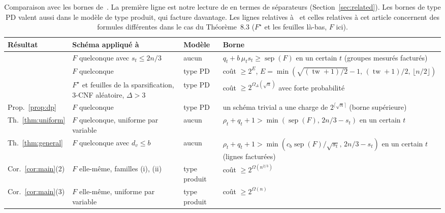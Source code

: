\documentclass[11pt,a4paper]{article}
\theoremstyle{definition}
\theoremstyle{remark}
\newcommand{\sep}{\operatorname{sep}}
\newcommand{\tw}{\operatorname{tw}}
\begin{document}
\begin{table}[t]
\centering
\small
\begin{tabular}{@{}>{\raggedright\arraybackslash}p{2.5cm}>{\raggedright\arraybackslash}p{3.7cm}>{\raggedright\arraybackslash}p{2.1cm}>{\raggedright\arraybackslash}p{6.2cm}@{}}
\toprule
Résultat & Schéma appliqué à & Modèle & Borne\\
\midrule
\cite[Th.~7.1(ii)]{DL} & $F$ quelconque avec $s_t\le 2n/3$ & aucun & $q_t+b\,\mu_ts_t\ge\sep(F)$ en un certain $t$ \newline(groupes mesurés facturés)\\[2pt]
\cite[Th.~8.1]{DL} & $F$ quelconque & type PD & coût $\ge2^{E}$, \newline $E=\min(\sqrt{(\tw+1)/2}-1,\,(\tw+1)/2,\,\lfloor n/2\rfloor)$\\[2pt]
\cite[Th.~8.3]{DL} & $F^\star$ et feuilles de la sparsification, 3-CNF aléatoire, $\Delta>3$ & type PD & coût $\ge2^{\Omega_\Delta(\sqrt n)}$ avec forte probabilité\\[2pt]
Prop.~\ref{prop:dp} & $F$ quelconque & type PD & un schéma trivial a une charge de $2^{\lceil\sqrt n\rceil}$ (borne supérieure)\\[2pt]
Th.~\ref{thm:uniform} & $F$ quelconque, uniforme par variable & aucun & $\rho_t+q_t+1>\min(\sep(F),\,2n/3-s_t)$ \newline en un certain $t$\\[2pt]
Th.~\ref{thm:general} & $F$ quelconque avec $d_v\le b$ & aucun & $\rho_t+q_t+1>\min(c_b\sep(F)/\sqrt{s_t},\,2n/3-s_t)$ \newline en un certain $t$ (lignes facturées)\\[2pt]
Cor.~\ref{cor:main}(2) & $F$ elle-même, familles (i), (ii) & type produit & coût $\ge2^{\Omega(n^{2/3})}$\\[2pt]
Cor.~\ref{cor:main}(3) & $F$ elle-même, uniforme par variable & type produit & coût $\ge2^{\Omega(n)}$\\
\bottomrule
\end{tabular}
\caption{Comparaison avec les bornes de~\cite{DL}. La première ligne est notre lecture de
\cite[Th.~7.1(ii)]{DL} en termes de séparateurs (Section~\ref{sec:related}). Les bornes
\og de type PD\fg{} valent aussi dans le modèle de type produit, qui facture davantage. Les
lignes relatives à~\cite{DL} et celles relatives à cet article concernent des formules
différentes dans le cas du Théorème~8.3 ($F^\star$ et les feuilles là-bas, $F$
ici).}\label{tab:compare}
\end{table}
\end{document}
